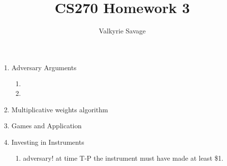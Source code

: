 \documentclass[a4paper]{article}
\title{CS270 Homework 3}
\author{Valkyrie Savage}
\begin{document}
\maketitle

\begin{enumerate}
\item Adversary Arguments
	\begin{enumerate}
	\item
	\item 
	\end{enumerate}
\item Multiplicative weights algorithm
\item Games and Application
\item Investing in Instruments
	\begin{enumerate}
	\item adversary!  at time T-P the instrument must have made at least \$1.
	\end{enumerate}
\end{enumerate}
\end{document}
